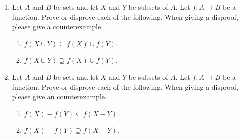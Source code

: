 \begin{enumerate}
\item Let $A$ and $B$ be sets and let $X$ and $Y$ be subsets of $A$. Let $f\colon A \to B$ be a function. Prove or disprove each of the following. When giving a disproof, please give a counterexample.
 \begin{enumerate}

  \item $f(X \cup Y) \subseteq f(X) \cup f(Y)$.
  \item $f(X \cup Y) \supseteq f(X) \cup f(Y)$.


 \end{enumerate}

\item Let $A$ and $B$ be sets and let $X$ and $Y$ be subsets of $A$. Let $f\colon A \to B$ be a function. Prove or disprove each of the following. When giving a disproof, please give an counterexample.
 \begin{enumerate}
  \item $f(X) - f(Y) \subseteq f(X - Y)$.
  \item $f(X) - f(Y) \supseteq f(X - Y)$.

 \end{enumerate}
 
 

\end{enumerate}


